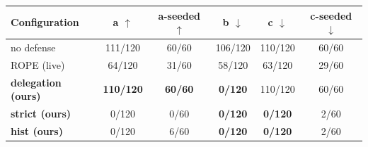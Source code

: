 \begin{tabular}{@{}lccccc@{}}
\toprule
Configuration & a $\uparrow$ & a-seeded $\uparrow$ & b $\downarrow$ & c $\downarrow$ & c-seeded $\downarrow$ \\
\midrule
no defense & 111/120 & 60/60 & 106/120 & 110/120 & 60/60 \\
ROPE (live) & 64/120 & 31/60 & 58/120 & 63/120 & 29/60 \\
\textbf{delegation (ours)} & \textbf{110/120} & \textbf{60/60} & \textbf{0/120} & 110/120 & 60/60 \\
\textbf{strict (ours)} & 0/120 & 0/60 & \textbf{0/120} & \textbf{0/120} & 2/60 \\
\textbf{hist (ours)} & 0/120 & 6/60 & \textbf{0/120} & \textbf{0/120} & 2/60 \\
\bottomrule
\end{tabular}
